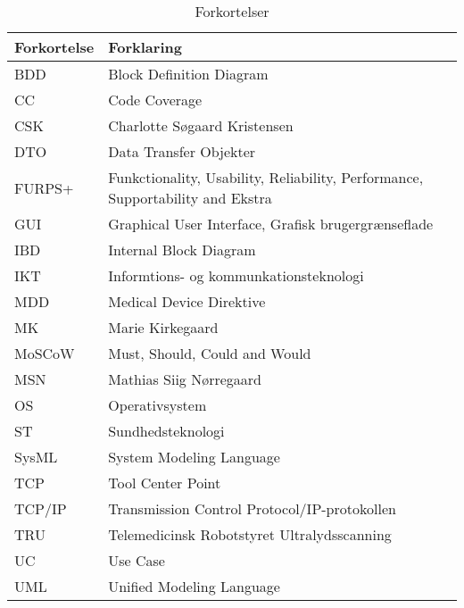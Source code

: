\begin{table}[htb]
\begin{tabular}{ | m{6em} | m{30em} | } \hline

\textbf{Forkortelse} & \textbf{Forklaring} \\ \hline
BDD & Block Definition Diagram \\\hline
CC & Code Coverage \\\hline
CSK & Charlotte Søgaard Kristensen \\ \hline 
DTO & Data Transfer Objekter \\\hline
FURPS+ & Funkctionality, Usability, Reliability, Performance, Supportability and Ekstra \\\hline
GUI & Graphical User Interface, Grafisk brugergrænseflade \\ \hline 
IBD & Internal Block Diagram \\\hline
IKT & Informtions- og kommunkationsteknologi\\\hline
MDD & Medical Device Direktive \\\hline
MK &  Marie Kirkegaard \\ \hline
MoSCoW & Must, Should, Could and Would \\\hline
MSN & Mathias Siig Nørregaard \\ \hline 
OS & Operativsystem \\\hline
ST & Sundhedsteknologi \\\hline
SysML &  System Modeling Language \\\hline
TCP & Tool Center Point \\\hline
TCP/IP & Transmission Control Protocol/IP-protokollen \\\hline
TRU & Telemedicinsk Robotstyret Ultralydsscanning\\\hline
UC & Use Case \\\hline
UML & Unified Modeling Language\\\hline
\end{tabular}
\caption{Forkortelser}
\end{table}
\newpage

